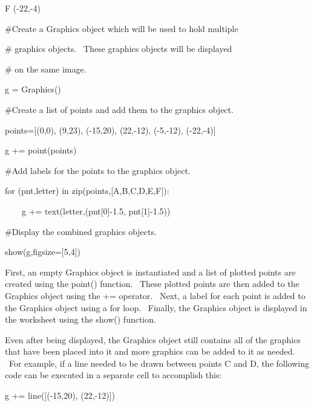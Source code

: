\documentclass[12pt,twoside]{book}
\begin{document}
F ({}-22,{}-4)

{\textquotedbl}{\textquotedbl}{\textquotedbl}


\bigskip

\#Create a Graphics object which will be used to hold multiple 

\# graphics objects. \ These graphics objects will be displayed

\# on the same image.

g = Graphics()


\bigskip

\#Create a list of points and add them to the graphics object.

points=[(0,0), (9,23), ({}-15,20), (22,{}-12), ({}-5,{}-12),
({}-22,{}-4)]

g += point(points)


\bigskip

\#Add labels for the points to the graphics object.

for (pnt,letter) in zip(points,[{\textquotesingle}A{\textquotesingle},{\textquotesingle}B{\textquotesingle},{\textquotesingle}C{\textquotesingle},{\textquotesingle}D{\textquotesingle},{\textquotesingle}E{\textquotesingle},{\textquotesingle}F{\textquotesingle}]):

\ \ \ \ g += text(letter,(pnt[0]{}-1.5, pnt[1]{}-1.5))


\bigskip

\#Display the combined graphics objects.

show(g,figsize=[5,4])

{\textbar}


\bigskip

First, an empty Graphics object is instantiated and a list of plotted points are created using the point() function. \ These plotted points are then added to the Graphics object using the += operator. \ Next, a label for each point is added to the Graphics object using a for loop. \ Finally, the Graphics object is displayed in the worksheet using the show() function. 

\bigskip

Even after being displayed, the Graphics object still contains all of the graphics that have been placed into it and more graphics can be added to it as needed. \ For example, if a line needed to be drawn between points C and D, the following code can be executed in a separate cell to accomplish this: 

\bigskip

g += line([({}-15,20), (22,{}-12)])
\end{document}
